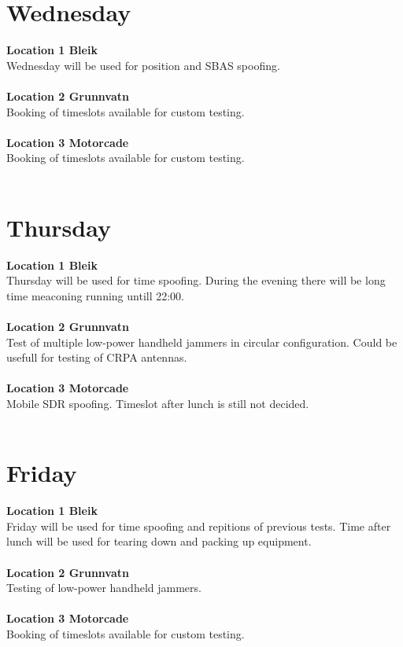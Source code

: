 \documentclass[a4paper]{book}
\begin{document}
\begin{landscape}
\chapter{Wednesday}
\Large \textbf{Location 1 Bleik} \\
Wednesday will be used for position and SBAS spoofing. \\ \\
\Large \textbf{Location 2 Grunnvatn} \\
Booking of timeslots available for custom testing.\\ \\
\Large \textbf{Location 3 Motorcade} \\
Booking of timeslots available for custom testing.\\ \\

%

\chapter{Thursday}
\Large \textbf{Location 1 Bleik} \\
Thursday will be used for time spoofing. During the evening there will be long time meaconing running untill 22:00.\\ \\
\Large \textbf{Location 2 Grunnvatn} \\
Test of multiple low-power handheld jammers in circular configuration. Could be usefull for testing of CRPA antennas.\\ \\
\Large \textbf{Location 3 Motorcade} \\
Mobile SDR spoofing. Timeslot after lunch is still not decided.\\ \\

%

\chapter{Friday}
\Large \textbf{Location 1 Bleik} \\
Friday will be used for time spoofing and repitions of previous tests. Time after lunch will be used for tearing down and packing up equipment.\\ \\
\Large \textbf{Location 2 Grunnvatn} \\
Testing of low-power handheld jammers.\\ \\
\Large \textbf{Location 3 Motorcade} \\
Booking of timeslots available for custom testing.\\ \\

%

\end{landscape}
\end{document}
